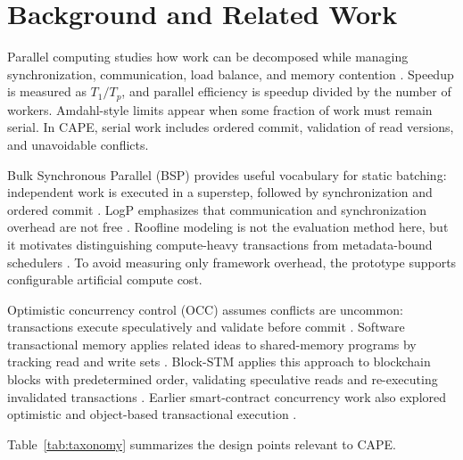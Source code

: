 \documentclass[runningheads]{llncs}
\begin{document}
\section{Background and Related Work}

Parallel computing studies how work can be decomposed while managing synchronization, communication, load balance, and memory contention \cite{pacheco2011parallel}. Speedup is measured as $T_1/T_p$, and parallel efficiency is speedup divided by the number of workers. Amdahl-style limits appear when some fraction of work must remain serial. In CAPE, serial work includes ordered commit, validation of read versions, and unavoidable conflicts.

Bulk Synchronous Parallel (BSP) provides useful vocabulary for static batching: independent work is executed in a superstep, followed by synchronization and ordered commit \cite{valiant1990bsp}. LogP emphasizes that communication and synchronization overhead are not free \cite{culler1993logp}. Roofline modeling is not the evaluation method here, but it motivates distinguishing compute-heavy transactions from metadata-bound schedulers \cite{williams2009roofline}. To avoid measuring only framework overhead, the prototype supports configurable artificial compute cost.

Optimistic concurrency control (OCC) assumes conflicts are uncommon: transactions execute speculatively and validate before commit \cite{kung1981optimistic}. Software transactional memory applies related ideas to shared-memory programs by tracking read and write sets \cite{shavit1997stm}. Block-STM applies this approach to blockchain blocks with predetermined order, validating speculative reads and re-executing invalidated transactions \cite{gelashvili2022blockstm}. Earlier smart-contract concurrency work also explored optimistic and object-based transactional execution \cite{anjana2018optimistic_smart_contracts,anjana2019object_tm_smart_contracts,reijsbergen2020transaction_concurrency}.

Table~\ref{tab:taxonomy} summarizes the design points relevant to CAPE.
\end{document}
